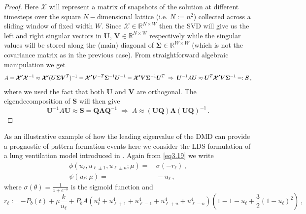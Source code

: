 \documentclass[../main.tex]{subfiles}
\begin{document}
\begin{proof}
        Here $\boldsymbol{\mathcal{X}}$ will represent a matrix of snapshots of the solution at different timesteps over the square $N-$dimensional lattice (i.e. $N:=n^{2}$) collected across a sliding window of fixed width $W$.
     Since $\boldsymbol{\mathcal{X}}\in \mathbb{R}^{N\times W}$ then the SVD will give us the left and right singular vectors in $\boldsymbol{U}$, $\boldsymbol{V}\in \mathbb{R}^{N\times W}$ respectively while the singular values will be stored along the (main) diagonal of $\boldsymbol{\Sigma}\in \mathbb{R}^{W\times W}$ (which is not the covariance matrix as in the previous case).
     From straightforward algebraic manipulation we get
     \begin{equation*}
          A = \boldsymbol{\mathcal{X'}}\boldsymbol{\mathcal{X}}^{-1}\approx \boldsymbol{\mathcal{X'}}(\boldsymbol{U}\boldsymbol{\Sigma}\boldsymbol{V}^{T})^{-1}=\boldsymbol{\mathcal{X'}}\boldsymbol{V}^{-T}\boldsymbol{\Sigma}^{-1}\boldsymbol{U}^{-1} = \boldsymbol{\mathcal{X'}}\boldsymbol{V}\boldsymbol{\Sigma}^{-1}\boldsymbol{U}^{T}\;\Rightarrow\;\boldsymbol{U}^{-1}A \boldsymbol{U}\approx \boldsymbol{U}^{T}\boldsymbol{\mathcal{X'}}\boldsymbol{V}\boldsymbol{\Sigma}^{-1}=:\boldsymbol{S}\,,
     \end{equation*}
     where we used the fact that both $\boldsymbol{U}$ and $\boldsymbol{V}$ are orthogonal. The eigendecomposition of $\boldsymbol{S}$ will then give
    \begin{equation*}
         \boldsymbol{U}^{-1}A \boldsymbol{U}\approx \boldsymbol{S}=\boldsymbol{Q}\boldsymbol{\Lambda}\boldsymbol{Q}^{-1}\;\Rightarrow\;A \approx (\boldsymbol{U}\boldsymbol{Q})\boldsymbol{\Lambda}(\boldsymbol{U}\boldsymbol{Q})^{-1}\,.
    \end{equation*}
\end{proof}
As an illustrative example of how the leading eigenvalue of the DMD can provide a prognostic of pattern-formation events here we consider the LDS formulation of a lung ventilation model introduced in \cite{Donovan15}. Again from \eqref{eq3.19} we write
\begin{align}
             \phi(u_{\ell}, u_{\ell\pm1},u_{\ell\pm n};\mu) =&\, \sigma(-r_{\ell})\,, \nonumber \\
            \psi(u_{\ell};\mu) =&\,-u_{\ell} \,,\nonumber
\end{align}
where $\sigma(\theta)=\frac{1}{1+e^{-\theta}}$ is the sigmoid function and 
$$r_{\ell}:=-P_{b}(t)+\mu \frac{k}{u_{\ell}}+P_{b}A(u_{\ell}^{4}+u_{\ell+1}^{4}+u_{\ell-1}^{4}+u_{\ell+n}^{4}+u_{\ell-n}^{4})(1 - 1 - u_{\ell}+ \frac{3}{2}(1-u_{\ell})^{2})\,,$$
\end{document}
